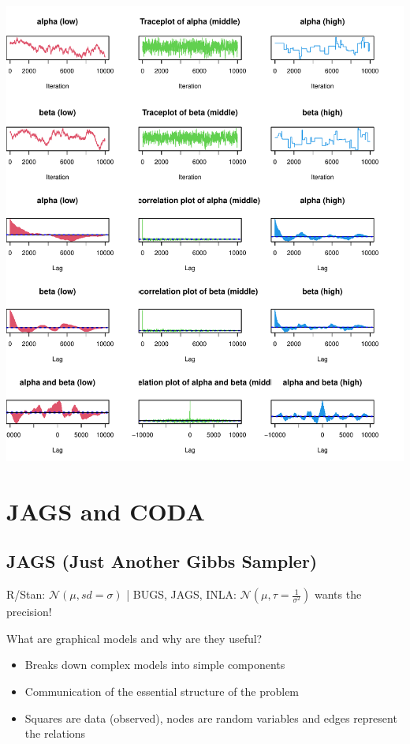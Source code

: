 \documentclass{article}\usepackage[]{graphicx}\usepackage[]{xcolor}
\makeatletter
\def\maxwidth{ %
  \ifdim\Gin@nat@width>\linewidth
    \linewidth
  \else
    \Gin@nat@width
  \fi
}
\newenvironment{knitrout}{}{} %
\makeatother
\begin{document}
\begin{multicols*}{2}
\begin{knitrout}
\color{fgcolor}
\includegraphics[width=\maxwidth]{figure/MH_coda-1} 
\end{knitrout}
\section{JAGS and CODA}
\subsection{JAGS (Just Another Gibbs Sampler)}
R/Stan: $\mathcal{N}(\mu,sd=\sigma)$
| BUGS, JAGS, INLA: $\mathcal{N}\left(\mu,\tau=\frac{1}{\sigma^2}\right)$ wants the precision!

What are graphical models and why are they useful?
\begin{itemize}
\item Breaks down complex models into simple components
\item Communication of the essential structure of the problem
\item Squares are data (observed), nodes are random variables and edges represent the relations
\end{itemize}




\end{multicols*}
\end{document}
